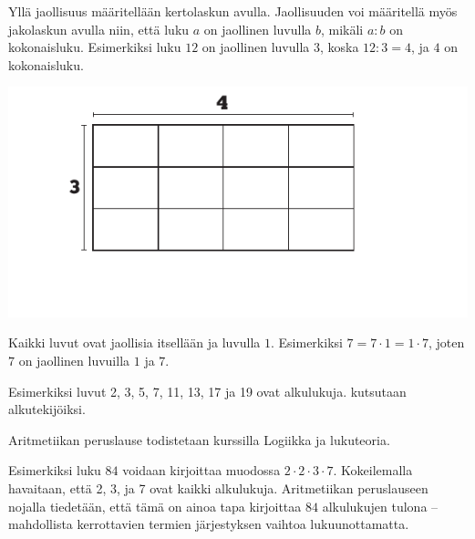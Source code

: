     

    
    Yllä jaollisuus määritellään kertolaskun avulla. Jaollisuuden voi määritellä myös jakolaskun avulla niin, että luku $a$ on jaollinen luvulla $b$, mikäli $a:b$ on kokonaisluku. Esimerkiksi luku $12$ on jaollinen luvulla $3$, koska $12:3 = 4$, ja $4$ on kokonaisluku.
   
    \begin{center}
     \includegraphics[scale=0.85]{pictures/Kuva2-4-3x4.pdf}
    \end{center}
    
    Kaikki luvut ovat jaollisia itsellään ja luvulla $1$. Esimerkiksi $7=7 \cdot 1=1 \cdot 7$, joten $7$ on jaollinen luvuilla $1$ ja $7$.
    
    
    Esimerkiksi luvut 2, 3, 5, 7, 11, 13, 17 ja 19 ovat alkulukuja.
    kutsutaan alkutekijöiksi.
    
    
   Aritmetiikan peruslause todistetaan kurssilla Logiikka ja lukuteoria.
    
    Esimerkiksi luku $84$ voidaan kirjoittaa muodossa $2\cdot 2\cdot 3\cdot 7$. Kokeilemalla havaitaan, että 2, 3, ja 7 ovat kaikki alkulukuja. Aritmetiikan peruslauseen nojalla tiedetään, että tämä on ainoa tapa kirjoittaa $84$ alkulukujen tulona -- mahdollista kerrottavien termien järjestyksen vaihtoa lukuunottamatta.
    
